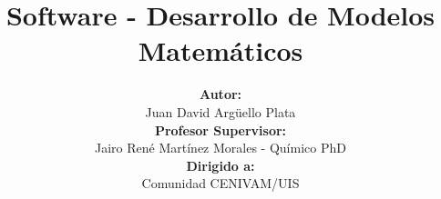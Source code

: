 \documentclass[20]{beamer}
\title[Software Modelado Matemático]{\textbf{Software - Desarrollo de Modelos Matem\'aticos}}
\author[Juan David]{
\textbf{Autor:}\\
Juan David Argüello Plata\\
\textbf{Profesor Supervisor:}\\
Jairo René Martínez Morales - Químico PhD\\
\textbf{Dirigido a:}\\
Comunidad CENIVAM/UIS
}
\institute[UIS]{
	CENIVAM\\
	Universidad Industrial de Santander
}
\date{}
\begin{document}
\begin{frame}
\titlepage
\end{frame}













\end{document}
